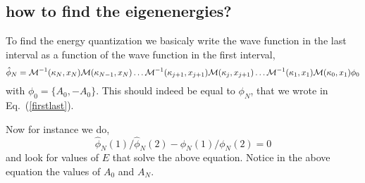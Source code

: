 \documentclass[singlecolumn]{revtex4}
\def\beq{\begin{equation}}{\it}
\def\eeq{\end{equation}}
\begin{document}
\subsection{how to find the eigenenergies?}
To find the energy quantization we basicaly write the wave function in the last interval as a function of the wave function in the first interval, 
\beq
\hat{\phi}_N = 
{\cal M}^{-1}(\kappa_{N},x_{N}) 
{\cal M}(\kappa_{N-1},x_{N})
\dots
{\cal M}^{-1}(\kappa_{j+1},x_{j+1}) 
{\cal M}(\kappa_{j},x_{j+1})
\dots
{\cal M}^{-1}(\kappa_{1},x_{1}) 
{\cal M}(\kappa_{0},x_{1})
\phi_0
\eeq
with $\phi_0=\{A_0,-A_0\}$. This should indeed be equal to $\phi_N$, that we wrote 
in Eq.~(\ref{firstlast}).

 Now for instance we do, 
\beq
\hat{\phi}_N(1)/\hat{\phi}_N(2) - \phi_N(1)/\phi_N(2)=0
\eeq
and look for values of $E$ that solve the above equation. Notice in the above 
equation the values of $A_0$ and $A_N$.

\begin{thebibliography}{99}

\end{thebibliography}
\end{document}

